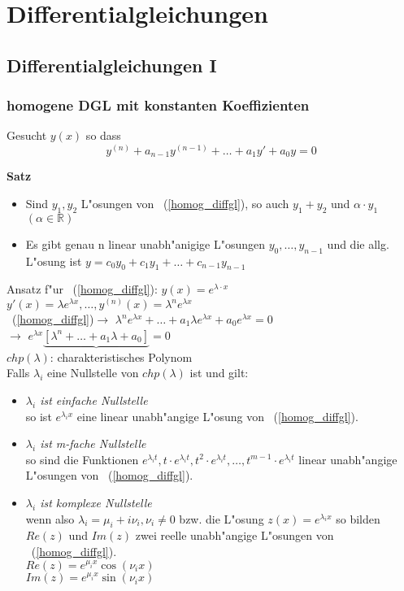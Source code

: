 \documentclass[10pt, a4paper, twocolumn]{scrartcl}
\begin{document}
\section{Differentialgleichungen}

\subsection{Differentialgleichungen I}

\subsubsection{homogene DGL mit konstanten Koeffizienten}

Gesucht $y(x)$ so dass
\begin{equation}
 \label{homog_diffgl}
 y^{(n)}+a_{n-1}y^{(n-1)}+\ldots+a_1y'+a_0y=0
\end{equation}

\textbf{Satz}
\begin{itemize}
 \item Sind $y_1,y_2$ L"osungen von ~(\ref{homog_diffgl}), so auch $y_1+y_2$ und $\alpha\cdotp y_1$ $(\alpha \in \mathbb{R})$
 \item Es gibt genau n linear unabh"anigige L"osungen $y_0,\ldots ,y_{n-1}$ und die allg. L"osung ist $y=c_0y_0 + c_1y_1+\ldots+c_{n-1}y_{n-1}$
\end{itemize}

Ansatz f"ur ~(\ref{homog_diffgl}): $y(x)=e^{\lambda\cdotp x}$\\
$y'(x)=\lambda e^{\lambda x},\ldots , y^{(n)}(x)=\lambda^{n}e^{\lambda x}$\\
~(\ref{homog_diffgl})$\rightarrow$ $\lambda^n e^{\lambda x}+\ldots +a_1\lambda e^{\lambda x}+a_0 e^{\lambda x}=0$\\
$\rightarrow$ $e^{\lambda x}\underbrace{[\lambda^n +\ldots+a_1\lambda+a_0]}=0$\\
$chp(\lambda)$: charakteristisches Polynom\\

Falls $\lambda_i$ eine Nullstelle von $chp(\lambda)$ ist und gilt:
\begin{itemize}
 \item \textit{$\lambda_i$ ist einfache Nullstelle}\\
  so ist $e^{\lambda_i x}$ eine linear unabh"angige L"osung von ~(\ref{homog_diffgl}).
 \item \textit{$\lambda_i$ ist m-fache Nullstelle}\\
  so sind die Funktionen $e^{\lambda_i t},t\cdotp e^{\lambda_i t},t^2\cdotp e^{\lambda_i t},\ldots,t^{m-1}\cdotp e^{\lambda_i t}$ linear unabh"angige L"osungen von ~(\ref{homog_diffgl}).
 \item \textit{$\lambda_i$ ist komplexe Nullstelle}\\
  wenn also $\lambda_i=\mu_i + i\nu_i, \nu_i\neq 0$ bzw. die L"osung $z(x)=e^{\lambda_i x}$ so bilden $Re(z)$ und $Im(z)$ zwei reelle unabh"angige L"osungen von ~(\ref{homog_diffgl}).\\
  $Re(z)=e^{\mu_i x}\cos(\nu_i x)$\\
  $Im(z)=e^{\mu_i x}\sin(\nu_i x)$\\
\end{itemize}
\end{document}
